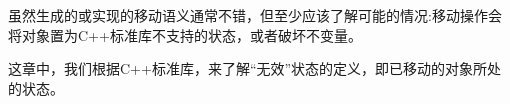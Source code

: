 虽然生成的或实现的移动语义通常不错，但至少应该了解可能的情况:移动操作会将对象置为C++标准库不支持的状态，或者破坏不变量。\par

这章中，我们根据C++标准库，来了解“无效”状态的定义，即已移动的对象所处的状态。\par